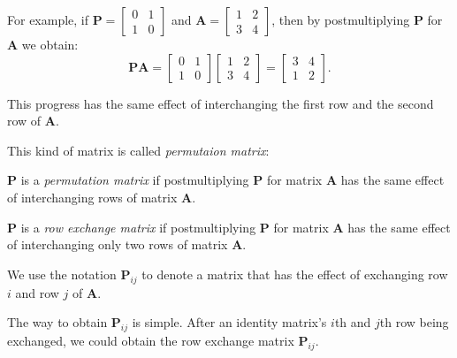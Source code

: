 For example, if $\bm P=\begin{bmatrix}
0&1\\1&0
\end{bmatrix}$ and $\bm A=\begin{bmatrix}
1&2\\3&4
\end{bmatrix}$, then by postmultiplying $\bm P$ for $\bm A$ we obtain:
\[
\bm{PA}=\begin{bmatrix}
0&1\\1&0
\end{bmatrix}\begin{bmatrix}
1&2\\3&4
\end{bmatrix}=\begin{bmatrix}
3&4\\1&2
\end{bmatrix}.
\]

This progress has the same effect of interchanging the first row and the second row of $\bm A$.

This kind of matrix is called \emph{permutaion matrix}:
\begin{definition}
$\bm P$ is a \emph{permutation matrix} if postmultiplying $\bm P$ for matrix $\bm A$ has the same effect of interchanging rows of matrix $\bm A$.
\end{definition}
\begin{definition}
$\bm P$ is a \emph{row exchange matrix} if postmultiplying $\bm P$ for matrix $\bm A$ has the same effect of interchanging only two rows of matrix $\bm A$.

We use the notation $\bm P_{ij}$ to denote a matrix that has the effect of exchanging row $i$ and row $j$ of $\bm A$.
\end{definition}

The way to obtain $\bm P_{ij}$ is simple. After an identity matrix’s $i$th and $j$th row being exchanged, we could obtain the row exchange matrix $\bm P_{ij}$.

